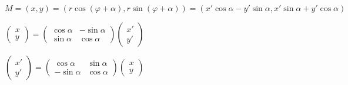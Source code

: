 \documentclass[twoside]{book}
\begin{document}
\begin{enumerate}[label=\alph*)]
\begin{itemize}
                    \(M = (x, y) = (r \cos(\varphi + \alpha), r \sin(\varphi + \alpha)) =
                    (x' \cos\alpha - y' \sin\alpha, x' \sin\alpha + y' \cos\alpha)\)

                    \(\begin{pmatrix}
                        x \\
                        y
                    \end{pmatrix} =
                    \begin{pmatrix}
                        \cos\alpha & -\sin\alpha \\
                        \sin\alpha & \cos\alpha
                    \end{pmatrix}
                    \begin{pmatrix}
                        x' \\
                        y'
                    \end{pmatrix}\)

                    \(\begin{pmatrix}
                        x' \\
                        y'
                    \end{pmatrix} =
                    \begin{pmatrix}
                        \cos\alpha  & \sin\alpha \\
                        -\sin\alpha & \cos\alpha
                    \end{pmatrix}
                    \begin{pmatrix}
                        x \\
                        y
                    \end{pmatrix}\)


\end{itemize}
\end{enumerate}
\end{document}
